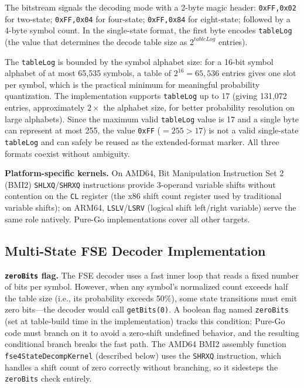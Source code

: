 \documentclass[journal]{IEEEtran}
\begin{document}
The bitstream signals the decoding mode with a 2-byte magic header:
\texttt{0xFF,0x02} for two-state; \texttt{0xFF,0x04} for four-state;
\texttt{0xFF,0x84} for eight-state; followed by a 4-byte symbol count.
In the single-state format, the first byte encodes
\texttt{tableLog} (the value that determines the decode table size as
$2^{\textit{tableLog}}$ entries).

The \texttt{tableLog} is bounded by the symbol alphabet size: for a 16-bit
symbol alphabet of at most 65,535 symbols, a table of $2^{16} = 65{,}536$
entries gives one slot per symbol, which is the practical minimum for
meaningful probability quantization. The implementation supports
\texttt{tableLog} up to 17 (giving 131,072 entries, approximately $2\times$
the alphabet size, for better probability resolution on large alphabets).
Since the maximum valid \texttt{tableLog} value is 17 and a single byte can
represent at most 255, the value \texttt{0xFF} ($= 255 > 17$) is not a valid
single-state \texttt{tableLog} and can safely be reused as the
extended-format marker. All three formats coexist without ambiguity.

\textbf{Platform-specific kernels.} On AMD64, Bit Manipulation Instruction
Set 2 (BMI2) \texttt{SHLXQ}/\texttt{SHRXQ} instructions provide 3-operand
variable shifts without contention on the \texttt{CL} register (the x86 shift
count register used by traditional variable shifts); on ARM64,
\texttt{LSLV}/\texttt{LSRV} (logical shift left/right variable) serve the same
role natively. Pure-Go implementations cover all other targets.

\subsection{Multi-State FSE Decoder Implementation}

\textbf{\texttt{zeroBits} flag.} The FSE decoder uses a fast inner loop that
reads a fixed number of bits per symbol. However, when any symbol's
normalized count exceeds half the table size (i.e., its probability exceeds
50\%), some state transitions must emit zero bits---the decoder would call
\texttt{getBits(0)}. A boolean flag named \texttt{zeroBits} (set at
table-build time in the implementation) tracks this condition; Pure-Go code
must branch on it to avoid a zero-shift undefined behavior, and the resulting
conditional branch breaks the fast path. The AMD64 BMI2 assembly function
\texttt{fse4StateDecompKernel} (described below) uses the \texttt{SHRXQ}
instruction, which handles a shift count of zero correctly without branching,
so it sidesteps the \texttt{zeroBits} check entirely.
\end{document}
